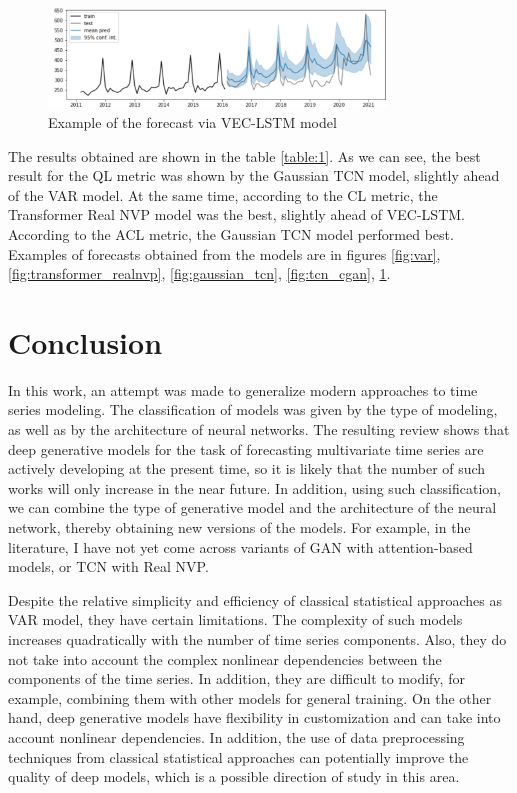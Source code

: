 \documentclass[12pt,a4paper]{article}
\begin{document}
\begin{figure}[!ht]
    \centering
    \includegraphics[width=0.8\textwidth]{vec_lstm.png}
    \caption{Example of the forecast via VEC-LSTM model}
    \label{fig:vec_lstm}
\end{figure}

The results obtained are shown in the table \ref{table:1}. As we can see, the best result for the QL metric was shown by the Gaussian TCN model, slightly ahead of the VAR model. At the same time, according to the CL metric, the Transformer Real NVP model was the best, slightly ahead of VEC-LSTM. According to the ACL metric, the Gaussian TCN model performed best. Examples of forecasts obtained from the models are in figures \ref{fig:var}, \ref{fig:transformer_realnvp}, \ref{fig:gaussian_tcn}, \ref{fig:tcn_cgan}, \ref{fig:vec_lstm}.

\section{Conclusion}

In this work, an attempt was made to generalize modern approaches to time series modeling. The classification of models was given by the type of modeling, as well as by the architecture of neural networks. The resulting review shows that deep generative models for the task of forecasting multivariate time series are actively developing at the present time, so it is likely that the number of such works will only increase in the near future. In addition, using such classification, we can combine the type of generative model and the architecture of the neural network, thereby obtaining new versions of the models. For example, in the literature, I have not yet come across variants of GAN with attention-based models, or TCN with Real NVP.

Despite the relative simplicity and efficiency of classical statistical approaches as VAR model, they have certain limitations. The complexity of such models increases quadratically with the number of time series components. Also, they do not take into account the complex nonlinear dependencies between the components of the time series. In addition, they are difficult to modify, for example, combining them with other models for general training. On the other hand, deep generative models have flexibility in customization and can take into account nonlinear dependencies. In addition, the use of data preprocessing techniques from classical statistical approaches can potentially improve the quality of deep models, which is a possible direction of study in this area.


\end{document}
